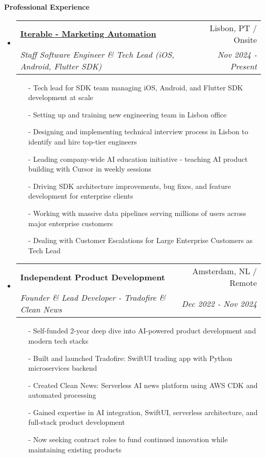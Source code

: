 \documentclass[letterpaper,11pt]{article}
\makeatletter
\newcommand{\resheading}[1]{{\large \colorbox{mygrey}{\begin{minipage}{\textwidth}{\textbf{#1 \vphantom{p\^{E}}}}\end{minipage}}}}
\newcommand{\ressubheading}[4]{
\begin{tabular*}{7.0in}{l@{\extracolsep{\fill}}r}
    \textbf{#1} & #2 \\
    \textit{#3} & \textit{#4} \\
\end{tabular*}\vspace{-6pt}}
\makeatother
\begin{document}
\resheading{Professional Experience}
\begin{itemize}

\item
    \ressubheading{\href{https://iterable.com}{Iterable - Marketing Automation}}{Lisbon, PT / Onsite}{Staff Software Engineer \& Tech Lead (iOS, Android, Flutter SDK)}{Nov 2024 - Present}
    \begin{itemize}
        \item[-]{Tech lead for SDK team managing iOS, Android, and Flutter SDK development at scale}
        \item[-]{Setting up and training new engineering team in Lisbon office}
        \item[-]{Designing and implementing technical interview process in Lisbon to identify and hire top-tier engineers}
        \item[-]{Leading company-wide AI education initiative - teaching AI product building with Cursor in weekly sessions}
        \item[-]{Driving SDK architecture improvements, bug fixes, and feature development for enterprise clients}
        \item[-]{Working with massive data pipelines serving millions of users across major enterprise customers}
        \item[-]{Dealing with Customer Escalations for Large Enterprise Customers as Tech Lead}
    \end{itemize}

\item
    \ressubheading{Independent Product Development}{Amsterdam, NL / Remote}{Founder \& Lead Developer - Tradofire \& Clean News}{Dec 2022 - Nov 2024}
    \begin{itemize}
        \item[-]{Self-funded 2-year deep dive into AI-powered product development and modern tech stacks}
        \item[-]{Built and launched Tradofire: SwiftUI trading app with Python microservices backend}
        \item[-]{Created Clean News: Serverless AI news platform using AWS CDK and automated processing}
        \item[-]{Gained expertise in AI integration, SwiftUI, serverless architecture, and full-stack product development}
        \item[-]{Now seeking contract roles to fund continued innovation while maintaining existing products}
    \end{itemize}


\end{itemize}
\end{document}
